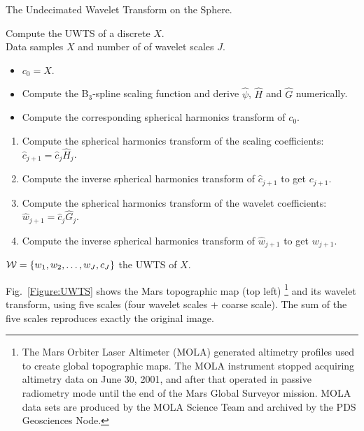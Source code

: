 
{\linespread{1}
\begin{algorithm}[h]
\caption{The Undecimated Wavelet Transform on the Sphere.}
\label{algo_uwts}
 Compute the UWTS of a discrete $X$.\\
 Data samples $X$ and number of of wavelet scales $J$.\\  
\begin{itemize}
\item $c_0=X$.
\item Compute the B$_3$-spline scaling function and derive $\hat{\psi}$, $\widehat{H}$ and $\widehat{G}$ numerically.
\item Compute the corresponding spherical harmonics transform of $c_0$.
\end{itemize}
 {
\begin{enumerate}[1.]
\item Compute the spherical harmonics transform of the scaling coefficients:  $\hat{c}_{j+1}=\hat{c}_j\widehat{H}_{j}$.
\item Compute the inverse spherical harmonics transform of $\hat{c}_{j+1}$ to get $c_{j+1}$.
\item Compute the spherical harmonics transform of the wavelet coefficients:  $\hat{w}_{j+1}=\hat{c}_j\widehat{G}_{j}$.
\item Compute the inverse spherical harmonics transform of $\hat{w}_{j+1}$ to get $w_{j+1}$.
\end{enumerate}
}
 ${\cal W}=\{w_1, w_2, \dots, w_{J}, c_{J}\}$ the UWTS of $X$.
\end{algorithm}
}

Fig.~\ref{Figure:UWTS} shows the Mars topographic map (top left)
\footnote{The Mars Orbiter Laser Altimeter (MOLA) generated altimetry profiles used to create global topographic maps. The MOLA instrument stopped acquiring altimetry data on June 30, 2001, and after that operated in passive radiometry mode until the end of the Mars Global Surveyor mission. MOLA data sets are produced by the MOLA Science Team and archived by the PDS Geosciences Node.} and its wavelet transform, using five scales (four wavelet scales + coarse scale). The sum of the five scales reproduces exactly the original image.

